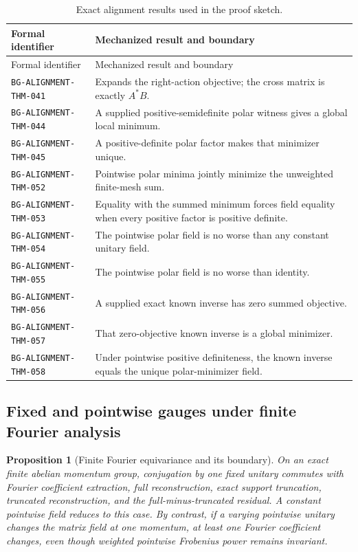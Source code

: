 \documentclass[11pt]{article}
\newtheorem{proposition}{Proposition}
\begin{document}
\begin{center}\small
\begin{longtable}{@{}>{\raggedright\arraybackslash}p{}
                         >{\raggedright\arraybackslash}p{}@{}}
\caption{Exact alignment results used in the proof sketch.}
\label{tab:formal-alignment}\\
\toprule
Formal identifier & Mechanized result and boundary \\
\midrule
\endfirsthead
\toprule
Formal identifier & Mechanized result and boundary \\
\midrule
\endhead
\texttt{BG-ALIGNMENT-THM-041} & Expands the right-action objective; the cross matrix is exactly $A^*B$. \\
\texttt{BG-ALIGNMENT-THM-044} & A supplied positive-semidefinite polar witness gives a global local minimum. \\
\texttt{BG-ALIGNMENT-THM-045} & A positive-definite polar factor makes that minimizer unique. \\
\texttt{BG-ALIGNMENT-THM-052} & Pointwise polar minima jointly minimize the unweighted finite-mesh sum. \\
\texttt{BG-ALIGNMENT-THM-053} & Equality with the summed minimum forces field equality when every positive factor is positive definite. \\
\texttt{BG-ALIGNMENT-THM-054} & The pointwise polar field is no worse than any constant unitary field. \\
\texttt{BG-ALIGNMENT-THM-055} & The pointwise polar field is no worse than identity. \\
\texttt{BG-ALIGNMENT-THM-056} & A supplied exact known inverse has zero summed objective. \\
\texttt{BG-ALIGNMENT-THM-057} & That zero-objective known inverse is a global minimizer. \\
\texttt{BG-ALIGNMENT-THM-058} & Under pointwise positive definiteness, the known inverse equals the unique polar-minimizer field. \\
\bottomrule
\end{longtable}
\end{center}

\subsection{Fixed and pointwise gauges under finite Fourier analysis}

\begin{proposition}[Finite Fourier equivariance and its boundary]
On an exact finite abelian momentum group, conjugation by one fixed unitary commutes with
Fourier coefficient extraction, full reconstruction, exact support truncation, truncated
reconstruction, and the full-minus-truncated residual. A constant pointwise field reduces
to this case. By contrast, if a varying pointwise unitary changes the matrix field at one
momentum, at least one Fourier coefficient changes, even though weighted pointwise
Frobenius power remains invariant.
\end{proposition}
\end{document}
